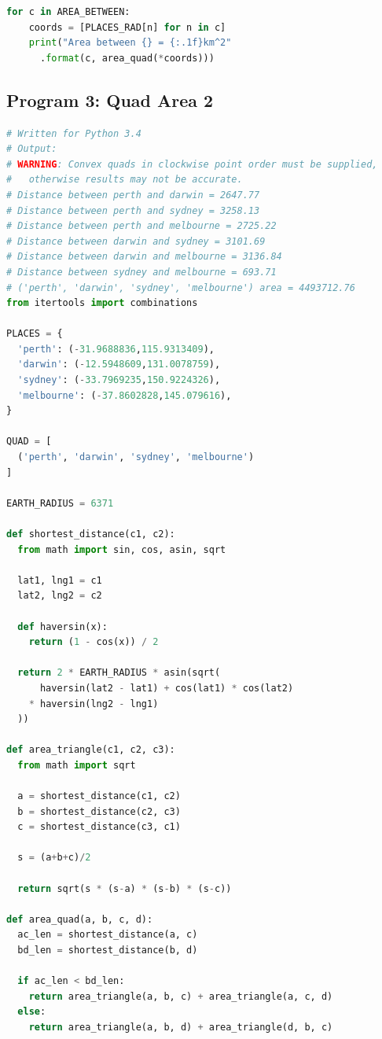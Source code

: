 \documentclass[a4paper,10pt]{article}
\begin{document}
\begin{appendices}
\begin{lstlisting}[language=Python]
  for c in AREA_BETWEEN:
    coords = [PLACES_RAD[n] for n in c]
    print("Area between {} = {:.1f}km^2"
      .format(c, area_quad(*coords)))
  \end{lstlisting}

  \clearpage
  \subsection{Program 3: Quad Area 2}
  \begin{lstlisting}[language=Python]
# Written for Python 3.4
# Output:
# WARNING: Convex quads in clockwise point order must be supplied, 
#   otherwise results may not be accurate.
# Distance between perth and darwin = 2647.77
# Distance between perth and sydney = 3258.13
# Distance between perth and melbourne = 2725.22
# Distance between darwin and sydney = 3101.69
# Distance between darwin and melbourne = 3136.84
# Distance between sydney and melbourne = 693.71
# ('perth', 'darwin', 'sydney', 'melbourne') area = 4493712.76
from itertools import combinations

PLACES = {
  'perth': (-31.9688836,115.9313409),
  'darwin': (-12.5948609,131.0078759),
  'sydney': (-33.7969235,150.9224326),
  'melbourne': (-37.8602828,145.079616),
}

QUAD = [
  ('perth', 'darwin', 'sydney', 'melbourne')
]

EARTH_RADIUS = 6371

def shortest_distance(c1, c2):
  from math import sin, cos, asin, sqrt
  
  lat1, lng1 = c1
  lat2, lng2 = c2
  
  def haversin(x):
    return (1 - cos(x)) / 2
  
  return 2 * EARTH_RADIUS * asin(sqrt(
      haversin(lat2 - lat1) + cos(lat1) * cos(lat2)
	* haversin(lng2 - lng1)
  ))

def area_triangle(c1, c2, c3):
  from math import sqrt
  
  a = shortest_distance(c1, c2)
  b = shortest_distance(c2, c3)
  c = shortest_distance(c3, c1)
  
  s = (a+b+c)/2
  
  return sqrt(s * (s-a) * (s-b) * (s-c))

def area_quad(a, b, c, d):
  ac_len = shortest_distance(a, c)
  bd_len = shortest_distance(b, d)
  
  if ac_len < bd_len:
    return area_triangle(a, b, c) + area_triangle(a, c, d)
  else:
    return area_triangle(a, b, d) + area_triangle(d, b, c)



\end{lstlisting}
\end{appendices}
\end{document}
